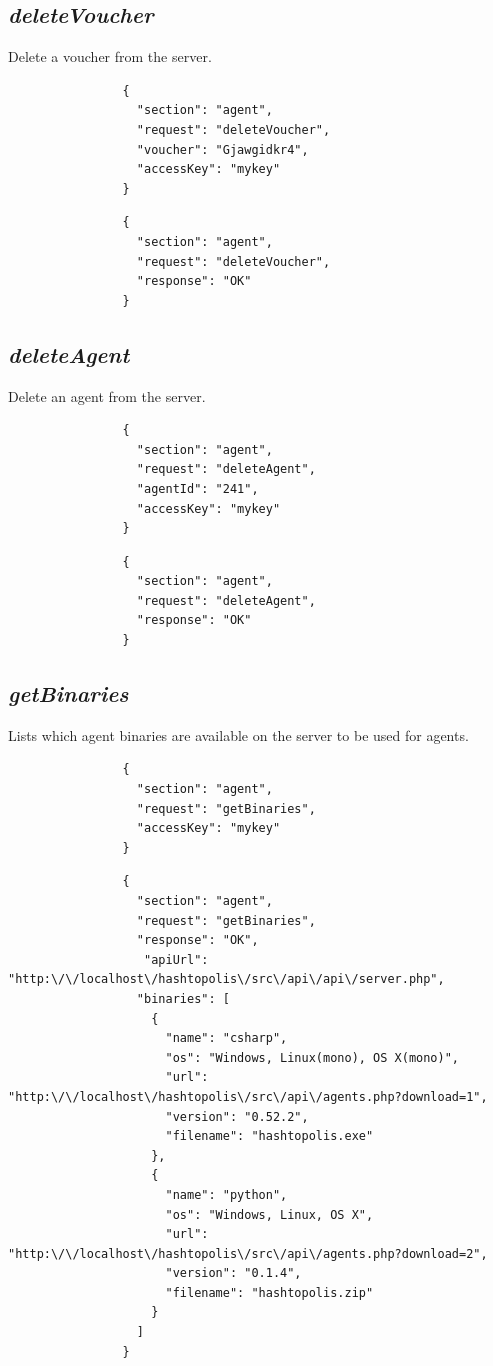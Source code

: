 		\subsection*{\textit{deleteVoucher}}
			Delete a voucher from the server.
			{
				\color{blue}
				\begin{verbatim}
				{
				  "section": "agent",
				  "request": "deleteVoucher",
				  "voucher": "Gjawgidkr4",
				  "accessKey": "mykey"
				}
				\end{verbatim}
			}
			{
				\color{OliveGreen}
				\begin{verbatim}
				{
				  "section": "agent",
				  "request": "deleteVoucher",
				  "response": "OK"
				}
				\end{verbatim}
			}
		\subsection*{\textit{deleteAgent}}
			Delete an agent from the server.
			{
				\color{blue}
				\begin{verbatim}
				{
				  "section": "agent",
				  "request": "deleteAgent",
				  "agentId": "241", 
				  "accessKey": "mykey"
				}
				\end{verbatim}
			}
			{
				\color{OliveGreen}
				\begin{verbatim}
				{
				  "section": "agent",
				  "request": "deleteAgent",
				  "response": "OK"
				}
				\end{verbatim}
			}
		\subsection*{\textit{getBinaries}}
			Lists which agent binaries are available on the server to be used for agents.
			{
				\color{blue}
				\begin{verbatim}
				{
				  "section": "agent",
				  "request": "getBinaries",
				  "accessKey": "mykey"
				}
				\end{verbatim}
			}
			{
				\color{OliveGreen}
				\begin{verbatim}
				{
				  "section": "agent",
				  "request": "getBinaries",
				  "response": "OK",
				   "apiUrl": "http:\/\/localhost\/hashtopolis\/src\/api\/api\/server.php",
				  "binaries": [
				    {
				      "name": "csharp",
				      "os": "Windows, Linux(mono), OS X(mono)",
				      "url": "http:\/\/localhost\/hashtopolis\/src\/api\/agents.php?download=1",
				      "version": "0.52.2",
				      "filename": "hashtopolis.exe"
				    },
				    {
				      "name": "python",
				      "os": "Windows, Linux, OS X",
				      "url": "http:\/\/localhost\/hashtopolis\/src\/api\/agents.php?download=2",
				      "version": "0.1.4",
				      "filename": "hashtopolis.zip"
				    }
				  ]
				}
				\end{verbatim}
			}